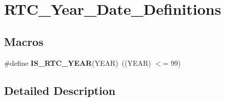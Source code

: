 \hypertarget{group___r_t_c___year___date___definitions}{\section{R\-T\-C\-\_\-\-Year\-\_\-\-Date\-\_\-\-Definitions}
\label{group___r_t_c___year___date___definitions}
}
\subsection*{Macros}
\begin{DoxyCompactItemize}
\item 
\hypertarget{group___r_t_c___year___date___definitions_gae59c9cfe6f9532ab26d74c25bcbe814b}{\#define {\bfseries I\-S\-\_\-\-R\-T\-C\-\_\-\-Y\-E\-A\-R}(Y\-E\-A\-R)~((Y\-E\-A\-R) $<$= 99)}\label{group___r_t_c___year___date___definitions_gae59c9cfe6f9532ab26d74c25bcbe814b}

\end{DoxyCompactItemize}


\subsection{Detailed Description}
